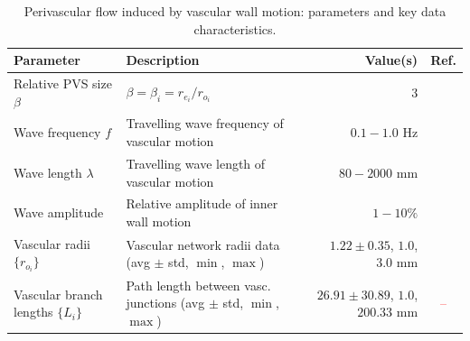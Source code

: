 \documentclass[fleqn,10pt]{wlscirep}
\newcommand{\discuss}[1]{\textcolor{red}{#1}}
\begin{document}
% 
\begin{table}
  \small
  \begin{tabular}{llrc}
    \toprule
    Parameter & Description & Value(s)  & Ref.\\ 
    \midrule
    Relative PVS size $\beta$ & $\beta = \beta_i = r_{e_i} / r_{o_i}$ & 3 & \cite{mestre2018flow} \\
    Wave frequency $f$ & Travelling wave frequency of vascular motion & $0.1-1.0$ Hz & \discuss{\cite{gjerde2023directional}} \\
    Wave length $\lambda$ & Travelling wave length of vascular motion & $80-2000$ mm & \discuss{\cite{gjerde2023directional}} \\
    Wave amplitude & Relative amplitude of inner wall motion & $1-10\%$ & \discuss{\cite{gjerde2023directional}} \\
    Vascular radii $\{r_{o_i}\}$ & Vascular network radii data (avg $\pm$ std, $\min$, $\max$) & $1.22 \pm 0.35$, $1.0$, $3.0$  mm & \cite{hodneland2019new} \\
    Vascular branch lengths $\{L_{i}\}$ & Path length between vasc. junctions (avg $\pm$ std, $\min$, $\max$) & $26.91 \pm 30.89$, $1.0$, $200.33$  mm & \discuss{--} \\
    \bottomrule
  \end{tabular}
  \caption{Perivascular flow induced by vascular wall motion: parameters and key data characteristics.}
  \label{tab:pvs:parameters}
\end{table}

\end{document}
